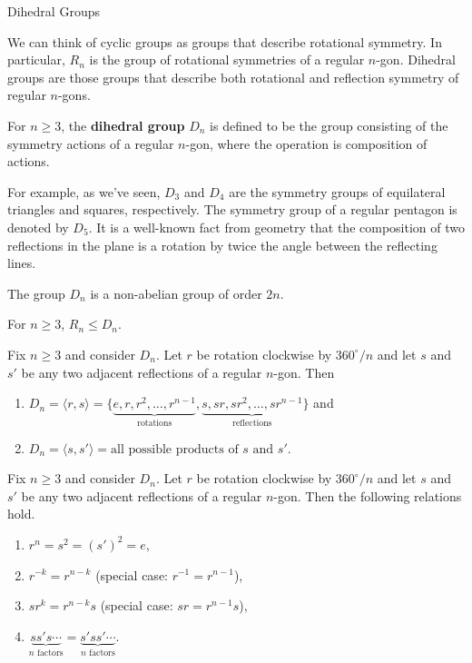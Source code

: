 \begin{section}{Dihedral Groups}

We can think of cyclic groups as groups that describe rotational symmetry.  In particular, $R_n$ is the group of rotational symmetries of a regular $n$-gon.  Dihedral groups are those groups that describe both rotational and reflection symmetry of regular $n$-gons.

\begin{definition}\label{def:dihedral}
For $n\geq 3$, the \textbf{dihedral group} $D_n$ is defined to be the group consisting of the symmetry actions of a regular $n$-gon, where the operation is composition of actions.
\end{definition}

For example, as we've seen, $D_3$ and $D_4$ are the symmetry groups of equilateral triangles and squares, respectively.  The symmetry group of a regular pentagon is denoted by $D_5$.  It is a well-known fact from geometry that the composition of two reflections in the plane is a rotation by twice the angle between the reflecting lines.

\begin{theorem}
The group $D_n$ is a non-abelian group of order $2n$.
\end{theorem}

\begin{theorem}
For $n\geq 3$, $R_n\leq D_n$.
\end{theorem}

\begin{theorem}\label{thm:generators_Dn}
Fix $n\geq 3$ and consider $D_n$. Let $r$ be rotation clockwise by $360^{\circ}/n$  and let $s$ and $s'$ be any two adjacent reflections of a regular $n$-gon.  Then
\begin{enumerate}[label=\rm{(\alph*)}]
\item $D_n=\langle r,s\rangle =\{\underbrace{e,r,r^2,\ldots, r^{n-1}}_{\text{rotations}},\underbrace{s,sr,sr^2,\ldots,sr^{n-1}}_{\text{reflections}}\}$ and
\item $D_n=\langle s,s'\rangle = \text{all possible products of }s\text{ and }s'$.
\end{enumerate}
\end{theorem}

\begin{theorem}
Fix $n\geq 3$ and consider $D_n$. Let $r$ be rotation clockwise by $360^{\circ}/n$  and let $s$ and $s'$ be any two adjacent reflections of a regular $n$-gon.  Then the following relations hold.
\begin{enumerate}[label=\rm{(\alph*)}]
\item $r^n = s^2 = (s')^2 =e$,
\item $r^{-k} = r^{n-k}$ (special case: $r^{-1}=r^{n-1}$),
\item $sr^k=r^{n-k}s$ (special case: $sr=r^{n-1}s$),
\item $\underbrace{ss's\cdots}_{n\text{ factors}}=\underbrace{s'ss'\cdots}_{n\text{ factors}}$.
\end{enumerate}
\end{theorem}


\end{section}
